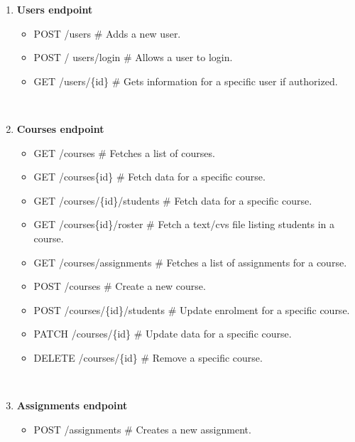 \documentclass[a4paper]{article}
\begin{document}
\parbox[t]{6.0in}{\raggedright%
\begin{enumerate}
  \item\textbf{Users endpoint}
  \begin{itemize}
    \item POST /users \# Adds a new user.\\[1mm]
    \item POST / users/login \# Allows a user to login.\\[1mm]
    \item GET /users/\{id\} \# Gets information for a specific user if authorized.\\[1mm]
  \end{itemize}
  \\[2mm]
  \item\textbf{Courses endpoint}
  \begin{itemize}
      \item GET /courses \# Fetches a list of courses.\\[1mm]
      \item GET /courses\{id\} \# Fetch data for a specific course.\\[1mm]
      \item GET /courses/\{id\}/students \# Fetch data for a specific course.\\[1mm]
      \item GET /courses\{id\}/roster \# Fetch a text/cvs file listing students in a course.\\[1mm]
      \item GET /courses/assignments \# Fetches a list of assignments for a course.\\[1mm]
      \item POST /courses \# Create a new course.\\[1mm]
      \item POST /courses/\{id\}/students \# Update enrolment for a specific course.\\[1mm]
      \item PATCH /courses/\{id\} \# Update data for a specific course.\\[1mm]
      \item DELETE /courses/\{id\} \# Remove a specific course.\\[1mm]
  \end{itemize}
  \\[2mm]
  \item\textbf{Assignments endpoint}
  \begin{itemize}
      \item POST /assignments \# Creates a new assignment.\\[1mm]

\end{itemize}
\end{enumerate}}
\end{document}
